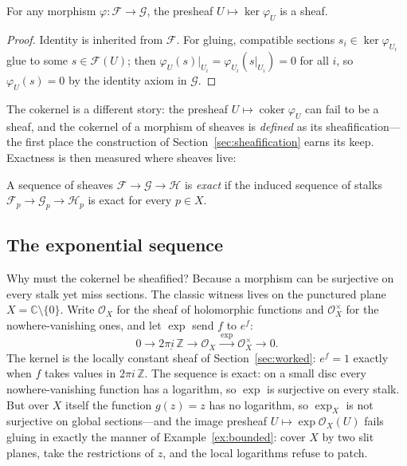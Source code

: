 \begin{proposition}
  \label{prop:kernel}
  For any morphism $\varphi \colon \mathcal{F} \to \mathcal{G}$, the
  presheaf $U \mapsto \ker \varphi_U$ is a sheaf.
\end{proposition}

\begin{proof}
  Identity is inherited from $\mathcal{F}$. For gluing, compatible
  sections $s_i \in \ker \varphi_{U_i}$ glue to some
  $s \in \mathcal{F}(U)$; then $\varphi_U(s)|_{U_i} =
  \varphi_{U_i}(s|_{U_i}) = 0$ for all $i$, so $\varphi_U(s) = 0$ by
  the identity axiom in $\mathcal{G}$.
\end{proof}

The cokernel is a different story: the presheaf
$U \mapsto \operatorname{coker} \varphi_U$ can fail to be a sheaf, and
the cokernel of a morphism of sheaves is \emph{defined} as its
sheafification---the first place the construction of
Section~\ref{sec:sheafification} earns its keep. Exactness is then
measured where sheaves live:

\begin{definition}
  \label{def:exact}
  A sequence of sheaves
  $\mathcal{F} \to \mathcal{G} \to \mathcal{H}$ is \emph{exact} if the
  induced sequence of stalks
  $\mathcal{F}_p \to \mathcal{G}_p \to \mathcal{H}_p$ is exact for
  every $p \in X$.
\end{definition}

\subsection{The exponential sequence}
\label{sec:exponential}

Why must the cokernel be sheafified? Because a morphism can be
surjective on every stalk yet miss sections. The classic witness lives
on the punctured plane $X = \mathbb{C} \setminus \{0\}$. Write
$\mathcal{O}_X$ for the sheaf of holomorphic functions and
$\mathcal{O}_X^{\times}$ for the nowhere-vanishing ones, and let
$\exp$ send $f$ to $e^{f}$:
\begin{equation}
  \label{eq:exponential}
  0 \longrightarrow \underline{2\pi i\,\mathbb{Z}}
    \longrightarrow \mathcal{O}_X
    \xrightarrow{\ \exp\ } \mathcal{O}_X^{\times}
    \longrightarrow 0 .
\end{equation}
The kernel is the locally constant sheaf of
Section~\ref{sec:worked}: $e^{f} = 1$ exactly when $f$ takes values in
$2\pi i\,\mathbb{Z}$. The sequence is exact: on a small disc every
nowhere-vanishing function has a logarithm, so $\exp$ is surjective on
every stalk. But over $X$ itself the function $g(z) = z$ has no
logarithm, so $\exp_X$ is not surjective on global sections---and the
image presheaf $U \mapsto \exp \mathcal{O}_X(U)$ fails gluing in
exactly the manner of Example~\ref{ex:bounded}: cover $X$ by two slit
planes, take the restrictions of $z$, and the local logarithms refuse
to patch.

